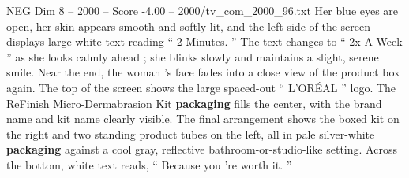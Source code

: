 \begin{textsample}{NEG Dim 8 – 2000 – Score -4.00 – 2000/tv\_com\_2000\_96.txt}
Her blue eyes are open, her skin appears smooth and softly lit, and the left side of the screen displays large white text reading “ 2 Minutes. ” The text changes to “ 2x A Week ” as she looks calmly ahead ; she blinks slowly and maintains a slight, serene smile.
Near the end, the woman ’s face fades into a close view of the product box again.
The top of the screen shows the large spaced-out “ L’ORÉAL ” logo.
The ReFinish Micro-Dermabrasion Kit \textbf{packaging} fills the center, with the brand name and kit name clearly visible.
The final arrangement shows the boxed kit on the right and two standing product tubes on the left, all in pale silver-white \textbf{packaging} against a cool gray, reflective bathroom-or-studio-like setting.
Across the bottom, white text reads, “ Because you ’re worth it. ”

\end{textsample}
